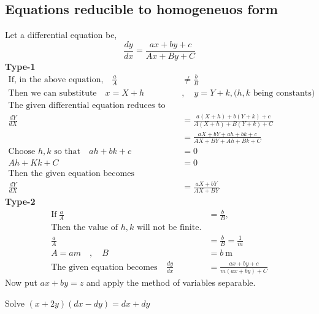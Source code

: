 \subsection{Equations reducible to homogeneuos form}
Let a differential equation be,
$$
\frac{d y}{d x}=\frac{a x+b y+c}{A x+B y+C}
$$
\textbf{Type-1}\\

\begin{align*}
\text{If, in the above equation,}\quad\frac{a}{A}&\neq\frac{b}{B}\\\text{Then we can substitute}\quad x=X+h\quad&,\quad y=Y+k,\text{($h, k$ being constants)}\\
\text{The given differential equation reduces to}\\
\frac{d Y}{d X}&=\frac{a(X+h)+b(Y+k)+c}{A(X+h)+B(Y+k)+C}\\&=\frac{a X+b Y+a h+b k+c}{A X+B Y+A h+B k+C}\\
\text{Choose $h, k$ so that} \quad a h+b k+c&=0\\
A h+K k+C&=0\\
\text{Then the given equation becomes homogeneous}\\\frac{d Y}{d X}&=\frac{a X+b Y}{A X+B Y}
\end{align*}
\textbf{Type-2}\\
\begin{align*}
\text{If}\ \frac{a}{A}&=\frac{b}{B},\\
\text{Then the value of $h, k$ will not be finite.}\\
\frac{a}{A}&=\frac{b}{B}=\frac{1}{m}\\
A=a m\quad, \quad B&=b \mathrm{~m}\\
\text{The given equation becomes}\quad\frac{d y}{d x}&=\frac{a x+b y+c}{m(a x+b y)+C}
\end{align*}
 Now put $a x+b y=z$ and apply the method of variables separable.
 \begin{exercise}
 	Solve $(x+2 y)(d x-d y)=d x+d y$
 \end{exercise}

